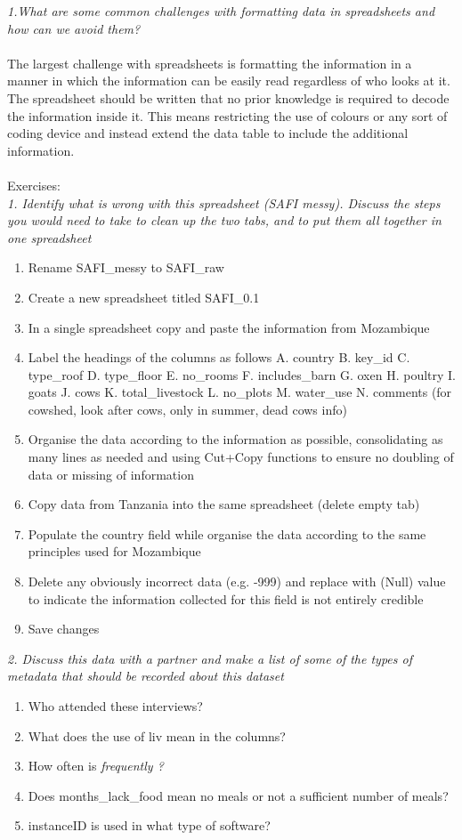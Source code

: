 \documentclass[12pt]{article}
\begin{document}
\textit{1.What are some common challenges with formatting data in spreadsheets and how can we avoid them?}\\
\\
The largest challenge with spreadsheets is formatting the information in a manner in which the information can be easily read regardless of who looks at it. The spreadsheet should be written that no prior knowledge is required to decode the information inside it. This means restricting the use of colours or any sort of coding device and instead extend the data table to include the additional information.\\
\\
Exercises:\\
\textit{1. Identify what is wrong with this spreadsheet (SAFI messy). Discuss the steps you would need to take to clean up the two tabs, and to put them all together in one spreadsheet}\\
\begin{enumerate}
    \item Rename SAFI\_messy to SAFI\_raw
    \item Create a new spreadsheet titled SAFI\_0.1
    \item In a single spreadsheet copy and paste the information from Mozambique 
    \item Label the headings of the columns as follows A. country B. key\_id C. type\_roof D. type\_floor E. no\_rooms F. includes\_barn G. oxen H. poultry I. goats J. cows K. total\_livestock L. no\_plots M. water\_use N. comments (for cowshed, look after cows, only in summer, dead cows info)
    \item Organise the data according to the information as possible, consolidating as many lines as needed and using Cut+Copy functions to ensure no doubling of data or missing of information
    \item Copy data from Tanzania into the same spreadsheet (delete empty tab)
    \item Populate the country field while organise the data according to the same principles used for Mozambique
    \item Delete any obviously incorrect data (e.g. -999) and replace with (Null) value to indicate the information collected for this field is not entirely credible
    \item Save changes
\end{enumerate}
\textit{2. Discuss this data with a partner and make a list of some of the types of metadata that should be recorded about this dataset}\\
\begin{enumerate}
    \item Who attended these interviews?
    \item What does the use of liv mean in the columns?
    \item How often is \textit{frequently ?}
    \item Does months\_lack\_food mean no meals or not a sufficient number of meals?
    \item instanceID is used in what type of software?
\end{enumerate}
\end{document}
